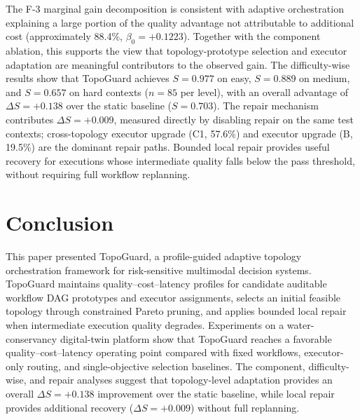 \documentclass[manuscript,review,anonymous]{acmart}
\begin{document}
The F-3 marginal gain decomposition is consistent with adaptive orchestration explaining a large portion of the quality advantage not attributable to additional cost (approximately 88.4\%, $\beta_0=+0.1223$). Together with the component ablation, this supports the view that topology-prototype selection and executor adaptation are meaningful contributors to the observed gain. The difficulty-wise results show that TopoGuard achieves $S=0.977$ on easy, $S=0.889$ on medium, and $S=0.657$ on hard contexts ($n=85$ per level), with an overall advantage of $\Delta S=+0.138$ over the static baseline ($S=0.703$). The repair mechanism contributes $\Delta S=+0.009$, measured directly by disabling repair on the same test contexts; cross-topology executor upgrade (C1, 57.6\%) and executor upgrade (B, 19.5\%) are the dominant repair paths. Bounded local repair provides useful recovery for executions whose intermediate quality falls below the pass threshold, without requiring full workflow replanning.

\section{Conclusion}
\label{sec:conclusion}

This paper presented TopoGuard, a profile-guided adaptive topology orchestration framework for risk-sensitive multimodal decision systems. TopoGuard maintains quality--cost--latency profiles for candidate auditable workflow DAG prototypes and executor assignments, selects an initial feasible topology through constrained Pareto pruning, and applies bounded local repair when intermediate execution quality degrades. Experiments on a water-conservancy digital-twin platform show that TopoGuard reaches a favorable quality--cost--latency operating point compared with fixed workflows, executor-only routing, and single-objective selection baselines. The component, difficulty-wise, and repair analyses suggest that topology-level adaptation provides an overall $\Delta S=+0.138$ improvement over the static baseline, while local repair provides additional recovery ($\Delta S=+0.009$) without full replanning.


\clearpage
\newpage


\end{document}
